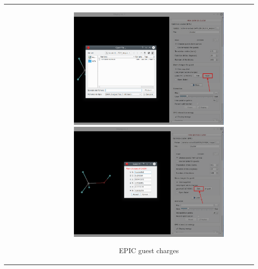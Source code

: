 \documentclass[10pt]{article}
\begin{document}
\begin{tabular}{lcr}
\begin{minipage}{.3\linewidth}
\begin{figure}[H]
    \end{figure}
\end{minipage}
&
\begin{minipage}{.3\linewidth}
\begin{figure}[H]
    \begin{center}
        \vspace*{-4mm}
        \includegraphics[width=1\linewidth]{damqt320_mespimizer_3b.png}
        \vspace*{3mm}
        \includegraphics[width=1\linewidth]{damqt320_mespimizer_4b.png}
    \end{center}
    \caption{EPIC guest charges\label{fig:4_10_3}}
\end{figure}
\end{minipage}
\end{tabular}
\end{document}
